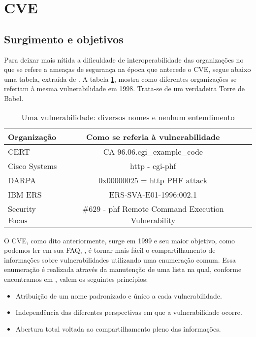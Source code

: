 	\section{CVE}
	\label{sec:cve}

		\subsection{Surgimento e objetivos}
			Para deixar mais nítida a dificuldade de interoperabilidade
			das organizações no que se refere a ameaças de segurança na época
			que antecede o CVE, segue abaixo uma tabela, extraída de \cite{Martin2001}.
			A tabela \ref{tab:torre_babel}, mostra
			como diferentes organizações se referiam à mesma vulnerabilidade
			em 1998. Trata-se de um verdadeira Torre de Babel.

			\begin{table}
				\begin{tabular}{|l|c|c|}
					\hline
						\textbf{Organização} & \textbf{Como se referia à vulnerabilidade}\\
					\hline
						CERT\footnotemark[1] & CA-96.06.cgi\_example\_code\\
					\hline
						Cisco Systems\footnotemark[2] & http - cgi-phf\\
					\hline
						DARPA & 0x00000025 = http PHF attack\\	
					\hline
						IBM ERS & ERS-SVA-E01-1996:002.1\\	
					\hline
						Security Focus\footnotemark[3] & \#629 - phf Remote Command Execution Vulnerability\\	
					\hline
				\end{tabular}
				\caption{Uma vulnerabilidade: diversos nomes e nenhum entendimento}\label{tab:torre_babel}
			\end{table}
			

			O CVE, como dito anteriormente, surge em 1999 e seu maior objetivo, como podemos
			ler em sua FAQ, \cite{CVE2010}, é tornar mais fácil
			o compartilhamento de informações sobre vulnerabilidades utilizando uma enumeração comum.
			Essa enumeração é realizada através da manutenção de uma lista na qual, conforme
			encontramos em \cite{Santos2004}, valem os seguintes princípios:
			\begin{itemize}
				\item{Atribuição de um nome padronizado e único a cada vulnerabilidade.}
				\item{Independência das diferentes perspectivas em que a vulnerabilidade ocorre.}
				\item{Abertura total voltada ao compartilhamento pleno das informações.}
			\end{itemize}


